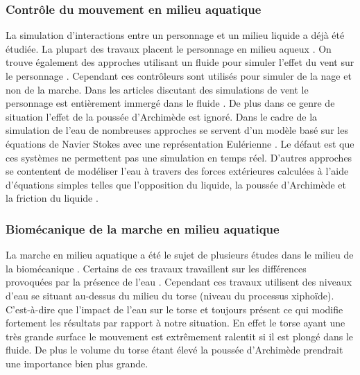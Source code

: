 \documentclass{llncs}
\begin{document}
\subsubsection{Contrôle du mouvement en milieu aquatique}
La simulation d'interactions entre un personnage et un milieu liquide a déjà été étudiée. La plupart des travaux placent le personnage en milieu aqueux \cite{yang2004layered,kwatra2010fluid,tan2011articulated,si2014realistic}. On trouve également des approches utilisant un fluide pour simuler l'effet du vent sur le personnage \cite{lentine2011creature}. Cependant ces contrôleurs sont utilisés pour simuler de la nage et non de la marche. Dans les articles discutant des simulations de vent le personnage est entièrement immergé dans le fluide \cite{lentine2011creature}. De plus dans ce genre de situation l'effet de la poussée d'Archimède est ignoré. Dans le cadre de la simulation de l'eau de nombreuses approches se servent d'un modèle basé sur les équations de Navier Stokes \cite{stam1999stable} avec une représentation Eulérienne \cite{si2014realistic}. Le défaut est que ces systèmes ne permettent pas une simulation en temps réel. D'autres approches se contentent de modéliser l'eau à travers des forces extérieures calculées à l'aide d'équations simples telles que l'opposition du liquide, la poussée d'Archimède et la friction du liquide \cite{yang2004layered}.

\subsubsection{Biomécanique de la marche en milieu aquatique}
La marche en milieu aquatique a été le sujet de plusieurs études dans le milieu de la biomécanique \cite{barela2006biomechanical,chevutschi2009comparison,orselli2011joint,miyoshi2005functional}. Certains de ces travaux travaillent sur les différences provoquées par la présence de l'eau \cite{barela2006biomechanical}. Cependant ces travaux utilisent des niveaux d'eau se situant au-dessus du milieu du torse (niveau du processus xiphoïde). C’est-à-dire que l'impact de l'eau sur le torse et toujours présent ce qui modifie fortement les résultats par rapport à notre situation. En effet le torse ayant une très grande surface le mouvement est extrêmement ralentit si il est plongé dans le fluide. De plus le volume du torse étant élevé la poussée d'Archimède prendrait une importance bien plus grande. 

\end{document}
